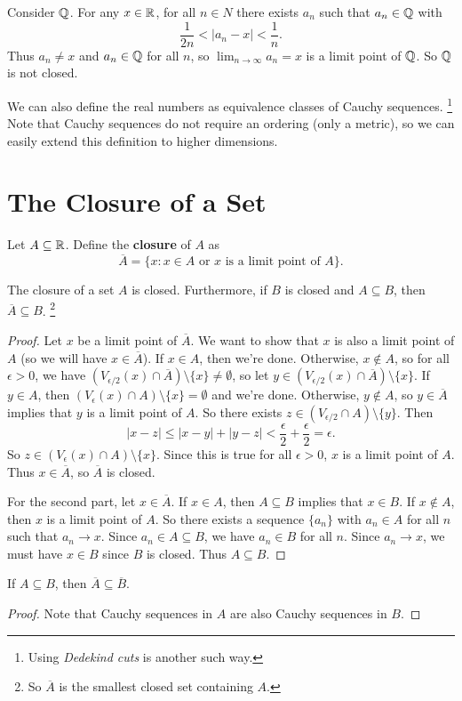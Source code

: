 \begin{example}
  Consider $\mathbb{Q}$. For any $x \in \mathbb{R}$, for all $n \in N$
  there exists $a_n$ such that $a_n \in \mathbb{Q}$ with
  \[
  \frac{1}{2n} < |a_n - x| < \frac{1}{n}
  .\]
  Thus $a_n \ne x$ and $a_n \in \mathbb{Q}$ for all $n$, so
  $\lim_{n \to \infty} a_n = x$ is a limit point of
  $\mathbb{Q}$. So $\mathbb{Q}$ is not closed.
\end{example}

\begin{remark}
  We can also define the real numbers as equivalence
  classes of Cauchy sequences.
  \footnote{Using \textit{Dedekind cuts} is another such way.}
  Note that Cauchy sequences
  do not require an ordering (only a metric), so we can
  easily extend this definition to higher dimensions.
\end{remark}

\section{The Closure of a Set}

\begin{definition}
  Let $A \subseteq \mathbb{R}$. Define the \textbf{closure}
  of $A$ as
  \[
    \overline{A} = \{x : x \in A \text{ or $x$ is a limit point of $A$}\}
  .\]
\end{definition}

\begin{theorem}
  The closure of a set $A$ is closed. Furthermore,
  if $B$ is closed and $A \subseteq B$, then
  $\overline{A} \subseteq B$.
  \footnote{So $\overline{A}$ is the smallest closed set
    containing $A$.}
\end{theorem}

\begin{proof}
  Let $x$ be a limit point of $\overline{A}$.
  We want to show that $x$ is also a limit point of $A$
  (so we will have $x \in \overline{A}$). If $x \in A$,
  then we're done. Otherwise, $x \notin A$, so for
  all $\epsilon > 0$, we have
  $(V_{\epsilon / 2}(x) \cap \overline{A}) \setminus \{x\} \ne \emptyset$,
  so let $y \in (V_{\epsilon / 2}(x) \cap \overline{A}) \setminus \{x\}$.
  If $y \in A$, then $(V_{\epsilon}(x) \cap A) \setminus \{x\}
  = \emptyset$ and we're done. Otherwise, $y \notin A$,
  so $y \in \overline{A}$ implies that $y$ is a limit
  point of $A$. So there exists
  $z \in (V_{\epsilon / 2} \cap A) \setminus \{y\}$.
  Then
  \[|x - z| \le |x - y| + |y - z| < \frac{\epsilon}{2} + \frac{\epsilon}{2} = \epsilon.\]
  So $z \in (V_\epsilon(x) \cap A) \setminus \{x\}$.
  Since this is true for all $\epsilon > 0$,
  $x$ is a limit point of $A$.
  Thus $x \in \overline{A}$, so $\overline{A}$ is closed.

  For the second part, let $x \in \overline{A}$. If
  $x \in A$, then $A \subseteq B$ implies that $x \in B$.
  If $x \notin A$, then $x$ is a limit point of $A$.
  So there exists a sequence $\{a_n\}$ with $a_n \in A$
  for all $n$ such that $a_n \to x$.
  Since $a_n \in A \subseteq B$, we have $a_n \in B$ for
  all $n$. Since $a_n \to x$, we must have
  $x \in B$ since $B$ is closed. Thus
  $A \subseteq B$.
\end{proof}

\begin{corollary}
  If $A \subseteq B$, then $\overline{A} \subseteq \overline{B}$.
\end{corollary}

\begin{proof}
  Note that
  Cauchy sequences in $A$ are also Cauchy sequences in $B$.
\end{proof}
